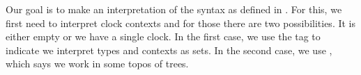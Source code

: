 
Our goal is to make an interpretation of the syntax as defined in .
For this, we first need to interpret clock contexts and for those there are two possibilities.
It is either empty or we have a single clock.
In the first case, we use the tag  to indicate we interpret types and contexts as sets.
In the second case, we use , which says we work in some topos of trees.

\begin{code}%
\>[0]\AgdaSpace{}%
\AgdaSpace{}%
\AgdaSymbol{:}\AgdaSpace{}%
\AgdaSpace{}%
\<%
\\
\>[0][@{}l@{\AgdaIndent{0}}]%
\>[2]\AgdaSpace{}%
\AgdaSymbol{:}\AgdaSpace{}%
\<%
\\
%
\>[2]\AgdaSpace{}%
\AgdaSymbol{:}\AgdaSpace{}%
\<%
\end{code}
